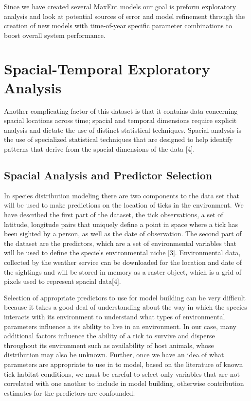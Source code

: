 \noindent Since we have created several MaxEnt models our goal is preform exploratory analysis and look at potential sources of error and model refinement through the creation of new models with time-of-year specific parameter combinations to boost overall system performance. 


\section{Spacial-Temporal Exploratory Analysis} 

Another complicating factor of this dataset is that it contains data concerning spacial locations across time; spacial and temporal dimensions require explicit analysis and dictate the use of distinct statistical techniques. Spacial analysis is the use of specialized statistical techniques that are designed to help identify patterns that derive from the spacial dimensions of the data [4]. \newline

\subsection{Spacial Analysis and Predictor Selection}
In species distribution modeling there are two components to the data set that will be used to make predictions on the location of ticks in the environment. We have described the first part of the dataset, the tick observations, a set of latitude, longitude pairs that uniquely define a point in space where a tick has been sighted by a person, as well as the date of observation. The second part of the dataset are the predictors, which are a set of environmental variables that will be used to define the specie's environmental niche [3]. Environmental data, collected by the weather service can be downloaded for the location and date of the sightings and will be stored in memory as a raster object, which is a grid of pixels used to represent spacial data[4].  \newline

\noindent Selection of appropriate predictors to use for model building can be very difficult because it takes a good deal of understanding about the way in which the species interacts with its environment to understand what types of environmental parameters influence a its ability to live in an environment. In our case, many additional factors influence the ability of a tick to survive and disperse throughout its environment such as availability of host animals, whose distribution may also be unknown. Further, once we have an idea of what parameters are appropriate to use in to model, based on the literature of known tick habitat conditions, we must be careful to select only variables that are not correlated with one another to include in model building, otherwise contribution estimates for the predictors are confounded. \newline

